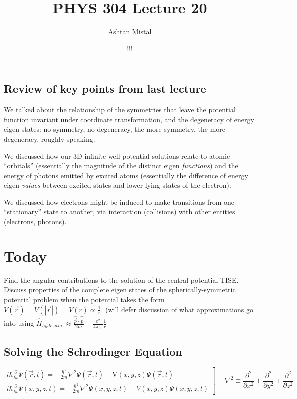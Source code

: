 \documentclass{article}
\title{PHYS 304 Lecture 20}
\author{Ashtan Mistal}
\date{!!!}
\begin{document}
\ifstandalone
\maketitle
\fi

\graphicspath{{./Lecture20/}}

\subsection{Review of key points from last lecture}

We talked about the relationship of the symmetries that leave the potential function invariant under coordinate transformation, and the degeneracy of energy eigen states: no symmetry, no degeneracy, the more symmetry, the more degeneracy, roughly speaking.

We discussed how our 3D infinite well potential solutions relate to atomic “orbitals” (essentially the magnitude of the distinct eigen \textit{functions}) and the energy of photons emitted by excited atoms (essentially the difference of energy eigen \textit{values }between excited states and lower lying states of the electron).

We discussed how electrons might be induced to make transitions from one “stationary” state to another, via interaction (collisions) with other entities (electrons, photons).

\section{Today}

Find the angular contributions to the solution of the central potential TISE.
Discuss properties of the complete eigen states of the spherically-symmetric potential problem when the potential takes the form $V(\vec{r}) = V(|\vec{r}|) = V(r) \propto \frac{1}{r}$.  (will defer discussion of what approximations go into using $\hat{H}_{hydr. atm.} \approx \frac{\hat{\vec{p}} \cdot \hat{\vec{p}}}{2m} - \frac{e^2}{4 \pi \epsilon_0} \frac{1}{r}$

\subsection{Solving the Schrodinger Equation}

$$
\left.\begin{array}{l}
i \hbar \frac{\partial}{\partial t} \Psi(\vec{r}, t)=-\frac{\hbar^{2}}{2 m} \nabla^{2} \Psi(\vec{r}, t)+\mathrm{V}(x, y, z) \Psi(\vec{r}, t) \\
i \hbar \frac{\partial}{\partial t} \Psi(x, y, z, t)=-\frac{\hbar^{2}}{2 m} \nabla^{2} \Psi(x, y, z, t)+V(x, y, z) \Psi(x, y, z, t)
\end{array}\right]-\nabla^{2} \equiv \frac{\partial^{2}}{\partial x^{2}}+\frac{\partial^{2}}{\partial y^{2}}+\frac{\partial^{2}}{\partial z^{2}}
$$
\end{document}
